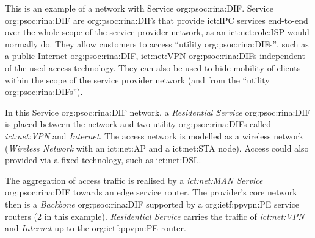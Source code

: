 This is an example of a network with Service \acs{org:psoc:rina:DIF}.
Service \acs{org:psoc:rina:DIF} are \acp{org:psoc:rina:DIF} that provide \acs{ict:IPC} services end-to-end over the whole scope of the service provider network, as an \acs{ict:net:role:ISP} would normally do.
They allow customers to access ``utility \acp{org:psoc:rina:DIF}'', such as a public Internet \ac{org:psoc:rina:DIF}, \ac{ict:net:VPN} \acp{org:psoc:rina:DIF} independent of the used access technology.
They can also be used to hide mobility of clients within the scope of the service provider network (and from the ``utility \acp{org:psoc:rina:DIF}'').

In this Service \acs{org:psoc:rina:DIF} network, a \textit{Residential Service} \ac{org:psoc:rina:DIF} is placed between the network and two utility \acp{org:psoc:rina:DIF} called \textit{\acs{ict:net:VPN}} and \textit{Internet}.
The access network is modelled as a wireless network (\textit{Wireless Network} with an \ac{ict:net:AP} and a \ac{ict:net:STA} node).
Access could also provided via a fixed technology, such as \acs{ict:net:DSL}.

The aggregation of access traffic is realised by a \textit{\acs{ict:net:MAN} Service} \ac{org:psoc:rina:DIF} towards an edge service router.
The provider's core network then is a \textit{Backbone} \ac{org:psoc:rina:DIF} supported by a \ac{org:ietf:ppvpn:PE} service routers (2 in this example).
\textit{Residential Service} carries the traffic of \textit{\acs{ict:net:VPN}} and \textit{Internet} up to the \ac{org:ietf:ppvpn:PE} router.
